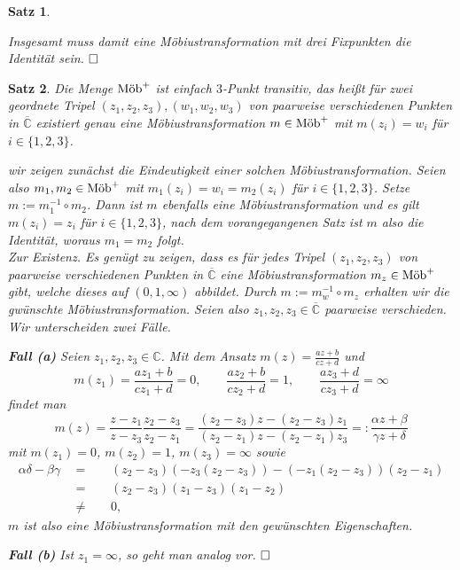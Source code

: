 \documentclass[11pt]{book}
\numberwithin{dummy}{section}
\newtheorem{theorem}{Satz}[section]
\theoremstyle{nonumberbreak}
\newenvironment{pr}[1][]{\ifthenelse{\equal{#1}{}}{\proof}{\proof[#1]}\rm}{\endproof}
\newcommand{\C}{\mathbb{C}}
\newcommand{\CC}{\overline{\mathbb{C}}}
\newcommand{\mob}{\textup{Möb}^+}
\begin{document}
\begin{spacing}{1.4}
\begin{theorem}
\begin{pr}
\begin{compactenum}
\end{compactenum}
Insgesamt muss damit eine Möbiustransformation mit drei Fixpunkten die Identität sein. $\hfill \Box$
\end{pr}
\end{theorem}


\hypertarget{satzeinsdreidrei}{}
\begin{theorem}    %
Die Menge $\mob$ ist \textit{einfach $3$-Punkt transitiv}, das heißt für zwei geordnete Tripel $(z_1, z_2, z_3), (w_1, w_2, w_3)$ von paarweise verschiedenen Punkten in $\CC$ existiert genau eine Möbiustransformation $m\in \mob$ mit $m(z_i) = w_i$ für $i \in \{1,2,3\}$. 


\begin{pr}
wir zeigen zunächst die Eindeutigkeit einer solchen Möbiustransformation. Seien also $m_1, m_2 \in \mob$ mit $m_1(z_i) = w_i = m_2(z_i)$ für $i \in \{1,2,3\}$. Setze $m:= m_1^{-1} \circ m_2$. Dann ist $m$ ebenfalls eine Möbiustransformation und es gilt $m(z_i) = z_i$ für $i \in \{1,2,3\}$, nach dem vorangegangenen Satz ist $m$ also die Identität, woraus $m_1 = m_2$ folgt.\\
Zur Existenz. Es genügt zu zeigen, dass es für jedes Tripel $(z_1, z_2, z_3)$ von paarweise verschiedenen Punkten in $\CC$ eine Möbiustransformation $m_z \in \mob$ gibt, welche dieses auf $(0,1,\infty)$ abbildet. Durch $m:= m_w^{-1} \circ m_z$ erhalten wir die gwünschte Möbiustransformation. Seien also $z_1, z_2, z_3 \in \CC$ paarweise verschieden. Wir unterscheiden zwei Fälle.
\begin{compactenum}
\item[\textbf{Fall (a)}] Seien $z_1, z_2, z_3 \in \C$. Mit dem Ansatz $m(z) = \frac{az+b}{cz+d}$ und 
$$m(z_1) = \frac{az_1 +b}{cz_1 + d} = 0, \qquad \frac{az_2+b}{cz_2+d}=1, \qquad \frac{az_3+d}{cz_3+d}= \infty$$ findet man
$$m(z) = \frac{z-z_1}{z-z_3} \frac{z_2-z_3}{z_2-z_1} = \frac{(z_2-z_3)z - (z_2-z_3)z_1}{(z_2-z_1)z - (z_2-z_1)z_3} =: \frac{\alpha z + \beta}{\gamma z + \delta}$$
mit $m(z_1)=0$, $m(z_2)=1$, $m(z_3)=\infty$ sowie
\begin{alignat*}
\alpha \delta - \beta \gamma \ \ &=&& \ \  (z_2-z_3)(-z_3(z_2-z_3)) - (-z_1(z_2-z_3))(z_2-z_1)\\
& =&& \ \  (z_2-z_3)(z_1-z_3)(z_1-z_2)\\
& \neq&& \ \  0,
\end{alignat*}
$m$ ist also eine Möbiustransformation mit den gewünschten Eigenschaften.
\item[\textbf{Fall (b)}] Ist $z_1 = \infty$, so geht man analog vor. $\hfill \Box$



\end{compactenum}
\end{pr}
\end{theorem}
\end{spacing}
\end{document}
